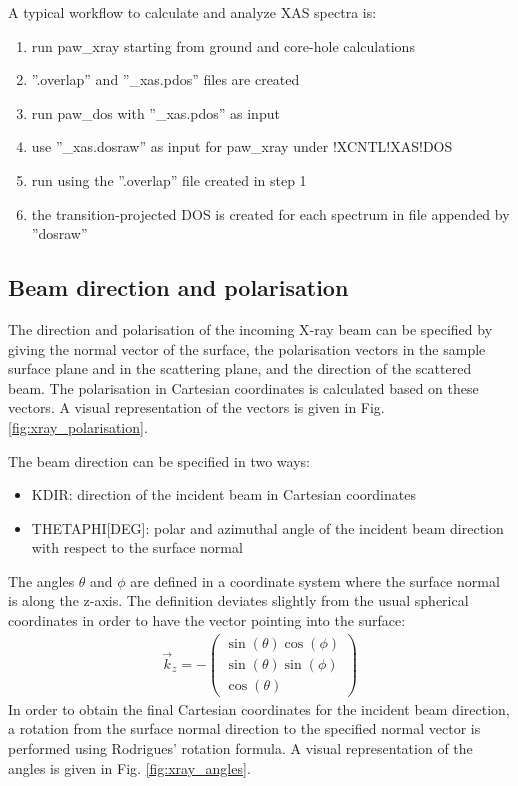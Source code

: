 \documentclass[final,12pt,makeidx,DIV=calc]{article}
\begin{document}
{{{{{{A typical workflow to calculate and analyze XAS spectra is:
\begin{enumerate}
  \item run paw\_xray starting from ground and core-hole calculations
  \item ''.overlap'' and ''\_xas.pdos'' files are created
  \item run paw\_dos with ''\_xas.pdos'' as input
  \item use ''\_xas.dosraw'' as input for paw\_xray under !XCNTL!XAS!DOS
  \item run using the ''.overlap'' file created in step 1
  \item the transition-projected DOS is created for each spectrum in file appended by ''dosraw''
\end{enumerate}

\subsection{Beam direction and polarisation}
The direction and polarisation of the incoming X-ray beam can be specified
by giving the normal vector of the surface, the polarisation vectors in the
sample surface plane and in the scattering plane, and the direction of the
scattered beam. The polarisation in Cartesian coordinates is calculated based
on these vectors. A visual representation of the vectors is given in
Fig. \ref{fig:xray_polarisation}.

The beam direction can be specified in two ways:
\begin{itemize}
  \item KDIR: direction of the incident beam in Cartesian coordinates
  \item THETAPHI[DEG]: polar and azimuthal angle of the incident beam
    direction with respect to the surface normal
\end{itemize}
The angles $\theta$ and $\phi$ are defined in a coordinate system where the
surface normal is along the z-axis. The definition deviates slightly from
the usual spherical coordinates in order to have the vector pointing into
the surface:
\begin{eqnarray}
  \vec{k}_z=-\begin{pmatrix}
    \sin(\theta)\cos(\phi) \\
    \sin(\theta)\sin(\phi) \\
    \cos(\theta)
  \end{pmatrix}
\end{eqnarray}
In order to obtain the final Cartesian coordinates for the incident beam
direction, a rotation from the surface normal direction to the specified
normal vector is performed using Rodrigues' rotation formula.
A visual representation of the angles is given in Fig. \ref{fig:xray_angles}.


}}}}}}
\end{document}

